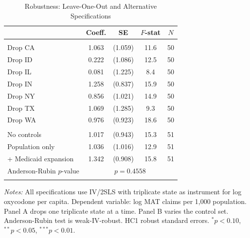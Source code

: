 \begin{table}[t]
\centering
\caption{Robustness: Leave-One-Out and Alternative Specifications}
\label{tab:robustness}
\small
\begin{tabular}{lcccc}
\hline\hline
 & Coeff. & SE & $F$-stat & $N$ \\
\hline
\addlinespace
\multicolumn{5}{l}{\textit{Panel A: Leave-one-out (dropping each triplicate state)}} \\
\addlinespace
Drop CA & 1.063 & (1.059) & 11.6 & 50 \\
Drop ID & 0.222 & (1.086) & 12.5 & 50 \\
Drop IL & 0.081 & (1.225) & 8.4 & 50 \\
Drop IN & 1.258 & (0.837) & 15.9 & 50 \\
Drop NY & 0.856 & (1.021) & 14.9 & 50 \\
Drop TX & 1.069 & (1.285) & 9.3 & 50 \\
Drop WA & 0.976 & (0.923) & 18.6 & 50 \\
\addlinespace
\multicolumn{5}{l}{\textit{Panel B: Alternative specifications}} \\
\addlinespace
No controls & 1.017 & (0.943) & 15.3 & 51 \\
Population only & 1.036 & (1.016) & 12.9 & 51 \\
+ Medicaid expansion & 1.342 & (0.908) & 15.8 & 51 \\
Anderson-Rubin $p$-value & \multicolumn{4}{c}{$p = 0.4558$} \\
\addlinespace
\hline\hline
\end{tabular}
\begin{tablenotes}
\item \textit{Notes:} All specifications use IV/2SLS with triplicate state as instrument for log oxycodone per capita. Dependent variable: log MAT claims per 1,000 population. Panel A drops one triplicate state at a time. Panel B varies the control set. Anderson-Rubin test is weak-IV-robust. HC1 robust standard errors. $^{*}p<0.10$, $^{**}p<0.05$, $^{***}p<0.01$.
\end{tablenotes}
\end{table}
